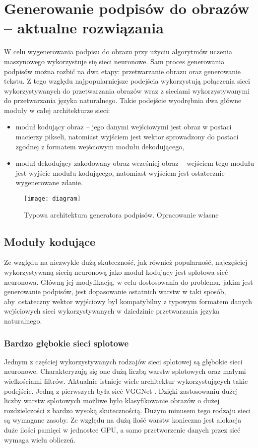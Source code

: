 \newpage %
\section{Generowanie podpisów do obrazów -- aktualne rozwiązania}
W celu wygenerowania podpisu do obrazu przy użyciu algorytmów uczenia maszynowego wykorzystuje się sieci neuronowe. Sam proces generowania podpisów można rozbić na dwa etapy: przetwarzanie obrazu oraz generowanie tekstu. Z tego względu najpopularniejsze podejścia wykorzystują połączenia sieci wykorzystywanych do przetwarzania obrazów wraz z sieciami wykorzystywanymi do przetwarzania języka naturalnego. Takie podejście wyodrębnia dwa główne moduły w całej architekturze sieci:
\begin{itemize}
  \item moduł kodujący obraz -- jego danymi wejściowymi jest obraz w postaci macierzy pikseli, natomiast wyjściem jest wektor sprowadzony do postaci zgodnej z formatem wejściowym modułu dekodującego,
  \item moduł dekodujący zakodowany obraz wcześniej obraz -- wejściem tego modułu jest wyjście modułu kodującego, natomiast wyjściem jest ostatecznie wygenerowane zdanie.
\end{itemize}
\begin{figure}[H]
  \centering
  \texttt{[image: diagram]}
  \caption{Typowa architektura generatora podpisów. Opracowanie własne}
  \label{fig:schemat-captioning}
\end{figure}
\subsection{Moduły kodujące}
Ze względu na niezwykle dużą skuteczność, jak również popularność, najczęściej wykorzystywaną siecią neuronową jako moduł kodujący jest splotowa sieć neuronowa. Główną jej modyfikacją, w celu dostosowania do problemu, jakim jest generowanie podpisów, jest dopasowanie ostatnich warstw w taki sposób, aby~ostateczny wektor wyjściowy był kompatybilny z typowym formatem danych wejściowych sieci wykorzystywanych w dziedzinie przetwarzania języka naturalnego.
\subsubsection{Bardzo głębokie sieci splotowe}
Jednym z częściej wykorzystywanych rodzajów sieci splotowej są głębokie sieci neuronowe. Charakteryzują się one dużą liczbą warstw splotowych oraz małymi wielkościami filtrów. Aktualnie istnieje wiele architektur wykorzystujących takie podejście. Jedną z pierwszych była sieć VGGNet \cite{vggnet}. Dzięki zastosowaniu dużej liczby warstw splotowych możliwe było klasyfikowanie obrazów o dużej rozdzielczości z bardzo wysoką skutecznością. Dużym minusem tego rodzaju sieci są wymagane zasoby. Ze względu na dużą ilość warstw konieczna jest alokacja duże ilości pamięci w jednostce GPU, a samo przetworzenie danych przez sieć wymaga wielu obliczeń.
